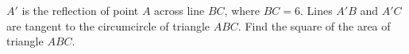 $A'$ is the reflection of point $A$ across line $BC$, where $BC=6$. Lines $A'B$ and $A'C$ are tangent to the circumcircle of triangle $ABC$. Find the square of the area of triangle $ABC$.
